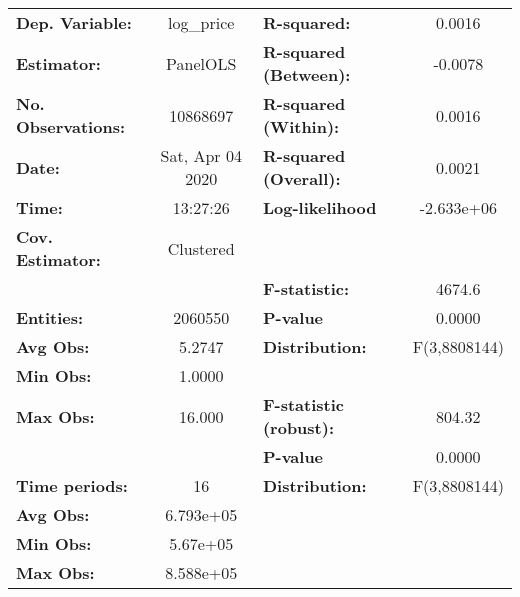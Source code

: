 \documentclass{report}
\begin{document}
\begin{center}
\begin{tabular}{lclc}
\toprule
\textbf{Dep. Variable:}        &     log\_price     & \textbf{  R-squared:         }   &      0.0016      \\
\textbf{Estimator:}            &      PanelOLS      & \textbf{  R-squared (Between):}  &     -0.0078      \\
\textbf{No. Observations:}     &      10868697      & \textbf{  R-squared (Within):}   &      0.0016      \\
\textbf{Date:}                 &  Sat, Apr 04 2020  & \textbf{  R-squared (Overall):}  &      0.0021      \\
\textbf{Time:}                 &      13:27:26      & \textbf{  Log-likelihood     }   &    -2.633e+06    \\
\textbf{Cov. Estimator:}       &     Clustered      & \textbf{                     }   &                  \\
\textbf{}                      &                    & \textbf{  F-statistic:       }   &      4674.6      \\
\textbf{Entities:}             &      2060550       & \textbf{  P-value            }   &      0.0000      \\
\textbf{Avg Obs:}              &       5.2747       & \textbf{  Distribution:      }   &   F(3,8808144)   \\
\textbf{Min Obs:}              &       1.0000       & \textbf{                     }   &                  \\
\textbf{Max Obs:}              &       16.000       & \textbf{  F-statistic (robust):} &      804.32      \\
\textbf{}                      &                    & \textbf{  P-value            }   &      0.0000      \\
\textbf{Time periods:}         &         16         & \textbf{  Distribution:      }   &   F(3,8808144)   \\
\textbf{Avg Obs:}              &     6.793e+05      & \textbf{                     }   &                  \\
\textbf{Min Obs:}              &      5.67e+05      & \textbf{                     }   &                  \\
\textbf{Max Obs:}              &     8.588e+05      & \textbf{                     }   &                  \\
\bottomrule
\end{tabular}
\begin{tabular}{lcccccc}

\end{tabular}
\end{center}
\end{document}
